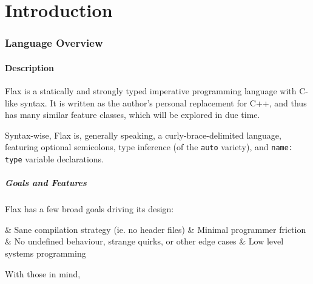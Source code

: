 

\pagebreak
\part{Introduction}

	\section{Language Overview}
		\subsection{Description}

			Flax is a statically and strongly typed imperative programming language with C-like syntax. It is written as the author's personal
			replacement for C++, and thus has many similar feature classes, which will be explored in due time.

			Syntax-wise, Flax is, generally speaking, a curly-brace-delimited language, featuring optional semicolons, type inference
			(of the \texttt{auto} variety), and \texttt{name: type} variable declarations.

			\subsubsection{Goals and Features}

				Flax has a few broad goals driving its design:

				\begin{bulletlist}
					& Sane compilation strategy (ie. no header files)
					& Minimal programmer friction
					& No undefined behaviour, strange quirks, or other edge cases
					& Low level systems programming
				\end{bulletlist}

				With those in mind,


